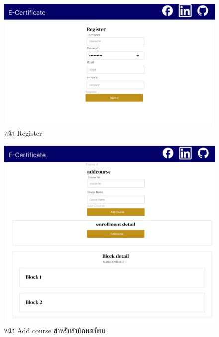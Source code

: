 \graphicspath{ {./images/} }
\begin{figure}[htbp]
  \centering 
  \includegraphics[scale=0.5]{figmaregis.png}
  \caption[หน้า Register]{หน้า Register}
  \label{fig:register}
\end{figure}

\graphicspath{ {./images/} }
\begin{figure}[htbp]
  \centering 
  \includegraphics[scale=0.5]{figmaadd.png}
  \caption[หน้า Add course สำหรับสำนักทะเบียน]{หน้า Add course สำหรับสำนักทะเบียน}
  \label{fig:adding}
\end{figure}

